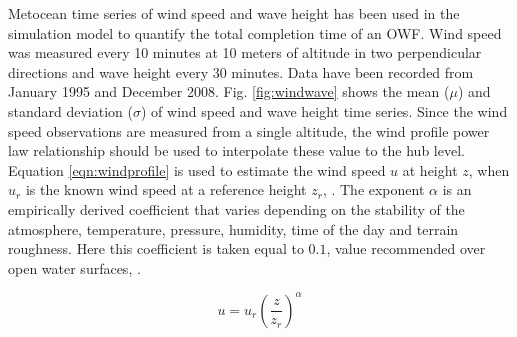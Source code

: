 Metocean time series of wind speed and wave height has been used in the simulation model to quantify the total completion time of an OWF. Wind speed was measured every 10 minutes at 10 meters of altitude in two perpendicular directions and wave height every 30 minutes. Data have been recorded from January 1995 and December 2008.
Fig. \ref{fig:windwave} shows the mean ($\mu$) and standard deviation ($\sigma$) of wind speed and wave height time series.
Since the wind speed observations are measured from a single altitude, the wind profile power law relationship should be used to interpolate these value to the hub level. Equation \ref{eqn:windprofile} is used to estimate the wind speed $u$ at height $z$, when $u_{r}$ is the known wind speed at a reference height $z_{r}$, \cite{Justus_1976, 1978Peterson}. The exponent $\alpha$ is an empirically derived coefficient that varies depending on the stability of the atmosphere, temperature, pressure, humidity, time of the day and terrain roughness. Here this coefficient is taken equal to $0.1$, value recommended over open water surfaces, \cite{WindEnergy2010}.

\begin{equation}
\label{eqn:windprofile}
u = u_{r} \left( \frac{z}{z_r} \right)^{\alpha}
\end{equation}